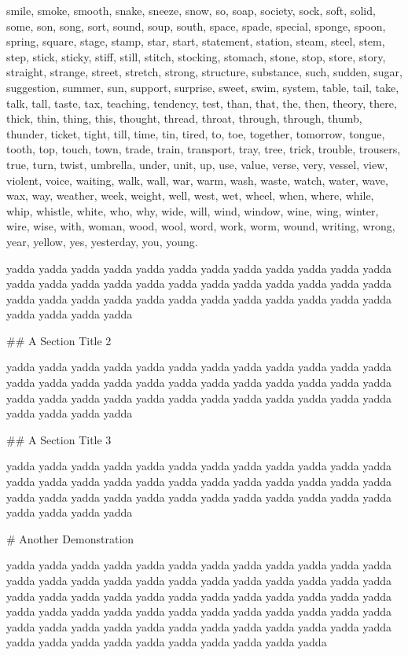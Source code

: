 \begin{multicols}{2}
smile, smoke, smooth, snake, sneeze, snow, so, soap, society, sock, soft,
solid, some, son, song, sort, sound, soup, south, space, spade, special,
sponge, spoon, spring, square, stage, stamp, star, start, statement, station,
steam, steel, stem, step, stick, sticky, stiff, still, stitch, stocking,
stomach, stone, stop, store, story, straight, strange, street, stretch,
strong, structure, substance, such, sudden, sugar, suggestion, summer, sun,
support, surprise, sweet, swim, system, table, tail, take, talk, tall, taste,
tax, teaching, tendency, test, than, that, the, then, theory, there, thick,
thin, thing, this, thought, thread, throat, through, through, thumb, thunder,
ticket, tight, till, time, tin, tired, to, toe, together, tomorrow, tongue,
tooth, top, touch, town, trade, train, transport, tray, tree, trick, trouble,
trousers, true, turn, twist, umbrella, under, unit, up, use, value, verse,
very, vessel, view, violent, voice, waiting, walk, wall, war, warm, wash,
waste, watch, water, wave, wax, way, weather, week, weight, well, west, wet,
wheel, when, where, while, whip, whistle, white, who, why, wide, will, wind,
window, wine, wing, winter, wire, wise, with, woman, wood, wool, word, work,
worm, wound, writing, wrong, year, yellow, yes, yesterday, you, young.\mktsShowpar\par
yadda yadda yadda yadda yadda yadda yadda yadda yadda yadda
yadda yadda yadda yadda yadda yadda yadda yadda yadda yadda
yadda yadda yadda yadda yadda yadda yadda yadda yadda yadda
yadda yadda yadda yadda yadda yadda yadda yadda yadda yadda\mktsShowpar\par
\#\# A Section Title 2 \mktsShowpar\par
yadda yadda yadda yadda yadda yadda yadda yadda yadda yadda
yadda yadda yadda yadda yadda yadda yadda yadda yadda yadda
yadda yadda yadda yadda yadda yadda yadda yadda yadda yadda
yadda yadda yadda yadda yadda yadda yadda yadda yadda yadda\mktsShowpar\par
\#\# A Section Title 3 \mktsShowpar\par
yadda yadda yadda yadda yadda yadda yadda yadda yadda yadda
yadda yadda yadda yadda yadda yadda yadda yadda yadda yadda
yadda yadda yadda yadda yadda yadda yadda yadda yadda yadda
yadda yadda yadda yadda yadda yadda yadda yadda yadda yadda\mktsShowpar\par
\# Another Demonstration\mktsShowpar\par
yadda yadda yadda yadda yadda yadda yadda yadda yadda yadda
yadda yadda yadda yadda yadda yadda yadda yadda yadda yadda
yadda yadda yadda yadda yadda yadda yadda yadda yadda yadda
yadda yadda yadda yadda yadda yadda yadda yadda yadda yadda
yadda yadda yadda yadda yadda yadda yadda yadda yadda yadda
yadda yadda yadda yadda yadda yadda yadda yadda yadda yadda
yadda yadda yadda yadda yadda yadda yadda yadda yadda yadda\mktsShowpar\par


\end{multicols}
